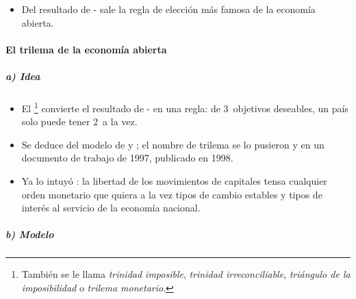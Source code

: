 \documentclass[11pt]{article}
\begin{document}
\begin{itemize}
  \begin{itemize}
  \item Como los precios se mueven despacio, la volatilidad del tipo nominal pasa casi entera al real: con tipos flexibles, el tipo real es mucho más volátil que con tipos fijos\nocite{Mussa1986Nominal}, y mueve los precios relativos sin relación con los fundamentos.
  \item Para que esa volatilidad no tenga efectos reales grandes, el país necesita precios internos flexibles.
  \end{itemize}
\item Del resultado de - sale la regla de elección más famosa de la economía abierta.
\end{itemize}

\paragraph{El trilema de la economía abierta}\label{sec:trilema}

\subparagraph{a) Idea}

\begin{itemize}
\item El \footnote{También se le llama \emph{trinidad imposible}, \emph{trinidad irreconciliable}, \emph{triángulo de la imposibilidad} o \emph{trilema monetario}.} convierte el resultado de - en una regla: de 3~objetivos deseables, un país solo puede tener 2~a la vez.
\item Se deduce del modelo de \textcite{Fleming1962Domestic} y \textcite{Mundell1963Capital}; el nombre de trilema se lo pusieron  y  en un documento de trabajo de 1997, publicado en 1998\nocite{ObstfeldTaylor1998Great,Economist2016Trilema}.
\item Ya lo intuyó \textcite{Keynes1930Treatise}: la libertad de los movimientos de capitales tensa cualquier orden monetario que quiera a la vez tipos de cambio estables y tipos de interés al servicio de la economía nacional.
\end{itemize}

\subparagraph{b) Modelo}
\end{document}
